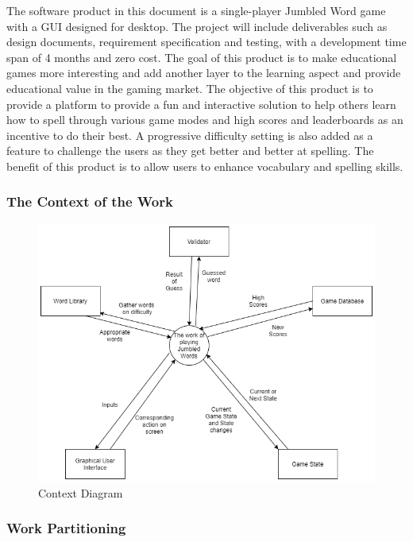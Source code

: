 \documentclass[12pt, titlepage]{article}
\begin{document}
The software product in this document is a single-player Jumbled Word game with a GUI designed for desktop.  The project will include deliverables such as design documents, requirement specification and testing, with a development time span of 4 months and zero cost. The goal of this product is to make educational games more interesting and add another layer to the learning aspect and provide educational value in the gaming market. 
The objective of this product is to provide a platform to provide a fun and interactive solution to help others learn how to spell through various game modes and high scores and leaderboards as an incentive to do their best. A progressive difficulty setting is also added as a feature to challenge the users as they get better and better at spelling. The benefit of this product is to allow users to enhance vocabulary and spelling skills. 

\subsubsection{The Context of the Work}

\begin{figure}[h]
	\centering
	\includegraphics[width=\textwidth]{context_of_work}
	\caption{Context Diagram}
\end{figure}

\subsubsection{Work Partitioning}
\end{document}
